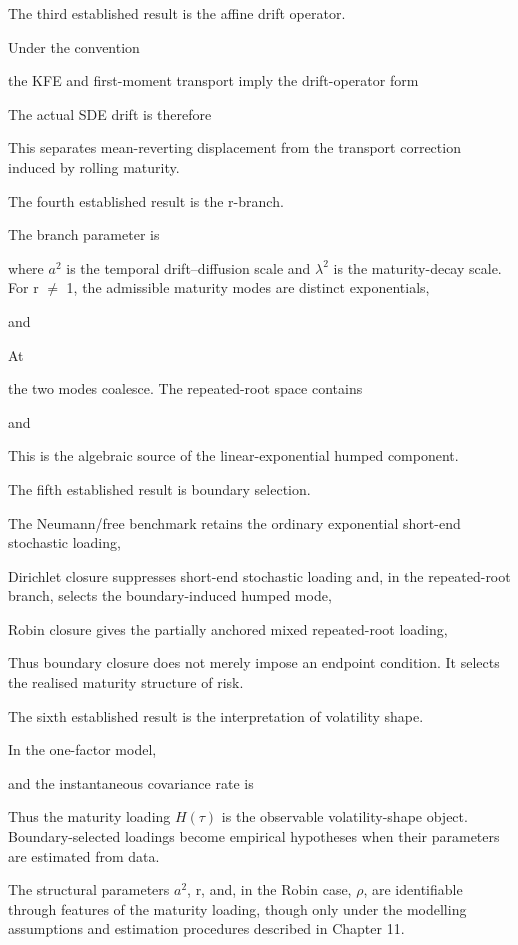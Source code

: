\documentclass[11pt,oneside]{book}
\begin{document}
The third established result is the affine drift operator.

Under the convention

the KFE and first-moment transport imply the drift-operator form

The actual SDE drift is therefore

This separates mean-reverting displacement from the transport correction
induced by rolling maturity.

The fourth established result is the r-branch.

The branch parameter is

where $a^2$ is the temporal drift--diffusion scale and $\lambda^2$ is the
maturity-decay scale. For r $\neq$ 1, the admissible maturity modes are
distinct exponentials,

and

At

the two modes coalesce. The repeated-root space contains

and

This is the algebraic source of the linear-exponential humped component.

The fifth established result is boundary selection.

The Neumann/free benchmark retains the ordinary exponential short-end
stochastic loading,

Dirichlet closure suppresses short-end stochastic loading and, in the
repeated-root branch, selects the boundary-induced humped mode,

Robin closure gives the partially anchored mixed repeated-root loading,

Thus boundary closure does not merely impose an endpoint condition. It
selects the realised maturity structure of risk.

The sixth established result is the interpretation of volatility shape.

In the one-factor model,

and the instantaneous covariance rate is

Thus the maturity loading $H(\tau)$ is the observable volatility-shape
object. Boundary-selected loadings become empirical hypotheses when
their parameters are estimated from data.

The structural parameters $a^2$, r, and, in the Robin case, $\rho$, are
identifiable through features of the maturity loading, though only under
the modelling assumptions and estimation procedures described in Chapter
11.
\end{document}
